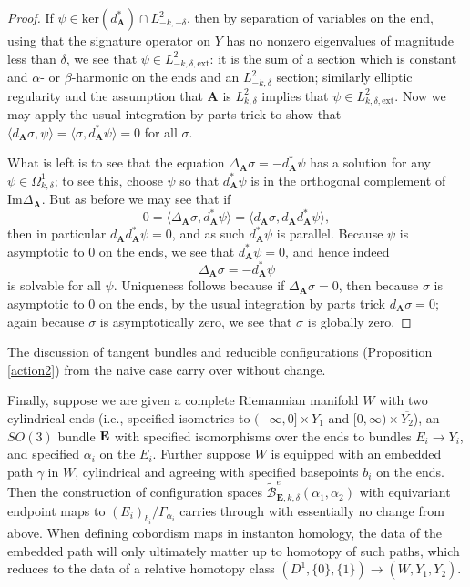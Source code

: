 \documentclass{memo-l}
\theoremstyle{definition}
\theoremstyle{remark}
\numberwithin{section}{chapter}
\numberwithin{equation}{chapter}
\begin{document}
\begin{proof}
If $\psi \in \text{ker}(d_{\mathbf{A}}^*) \cap L^2_{-k,-\delta}$, then by separation of variables on the end, using that the signature operator on $Y$ has no nonzero eigenvalues of magnitude less than $\delta$, we see that $\psi \in L^2_{-k,\delta,\text{ext}}$: it is the sum of a section which is constant and $\alpha$- or $\beta$-harmonic on the ends and an $L^2_{-k,\delta}$ section; similarly elliptic regularity and the assumption that $\mathbf{A}$ is $L^2_{k,\delta}$ implies that $\psi \in L^2_{k,\delta,\text{ext}}$. Now we may apply the usual integration by parts trick to show that $\langle d_{\mathbf{A}} \sigma, \psi \rangle = \langle \sigma, d_{\mathbf{A}}^* \psi \rangle = 0$ for all $\sigma$.

What is left is to see that the equation $\Delta_{\mathbf{A}} \sigma = -d_{\mathbf{A}}^* \psi$ has a solution for any $\psi \in \Omega^1_{k,\delta}$; to see this, choose $\psi$ so that $d_{\mathbf{A}}^* \psi$ is in the orthogonal complement of $\text{Im} \Delta_{\mathbf{A}}$. But as before we may see that if 
$$0 = \langle \Delta_{\mathbf{A}} \sigma, d_{\mathbf{A}}^* \psi \rangle = \langle d_{\mathbf{A}} \sigma, d_{\mathbf{A}} d_{\mathbf{A}}^* \psi \rangle,$$ 
then in particular $d_{\mathbf{A}} d_{\mathbf{A}}^* \psi = 0$, and as such $d_{\mathbf{A}}^* \psi$ is parallel. Because $\psi$ is asymptotic to $0$ on the ends, we see that $d_{\mathbf{A}}^* \psi = 0$, and hence indeed
$$\Delta_{\mathbf{A}} \sigma = -d_{\mathbf{A}}^* \psi$$ 
is solvable for all $\psi$. Uniqueness follows because if $\Delta_{\mathbf{A}} \sigma = 0$, then because $\sigma$ is asymptotic to $0$ on the ends, by the usual integration by parts trick $d_{\mathbf{A}} \sigma = 0$; again because $\sigma$ is asymptotically zero, we see that $\sigma$ is globally zero. 
\end{proof}

The discussion of tangent bundles and reducible configurations (Proposition \ref{action2}) from the naive case carry over without change.

Finally, suppose we are given a complete Riemannian manifold $W$ with two cylindrical ends (i.e., specified isometries to $(-\infty, 0] \times Y_1$ and $[0,\infty) \times \overline{Y_2}$), an $SO(3)$ bundle $\bf E$ with specified isomorphisms over the ends to bundles $E_i \to Y_i$, and specified $\alpha_i$ on the $E_i$. Further suppose $W$ is equipped with an embedded path $\gamma$ in $W$, cylindrical and agreeing with specified basepoints $b_i$ on the ends. Then the construction of configuration spaces $\widetilde{\mathcal B}^{e}_{\mathbf{E},k,\delta}(\alpha_1, \alpha_2)$ with equivariant endpoint maps to $(E_i)_{b_i}/\Gamma_{\alpha_i}$ carries through with essentially no change from above. When defining cobordism maps in instanton homology, the data of the embedded path will only ultimately matter up to homotopy of such paths, which reduces to the data of a relative homotopy class $(D^1, \{0\}, \{1\}) \to (\overline W, Y_1, Y_2)$.
\end{document}
